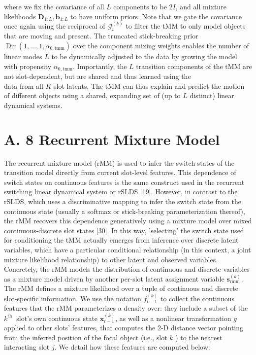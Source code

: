 \documentclass[10pt]{article}
\begin{document}
where we fix the covariance of all $L$ components to be $2 I$, and all mixture likelihoods $\boldsymbol{D}_{1: L}, \boldsymbol{b}_{1: L}$ to have uniform priors. Note that we gate the covariance once again using the reciprocal of $\mathcal{G}_{t}^{(k)}$ to filter the tMM to only model objects that are moving and present. The truncated stick-breaking prior $\operatorname{Dir}\left(1, \ldots, 1, \alpha_{0, \mathrm{tmm}}\right)$ over the component mixing weights enables the number of linear modes $L$ to be dynamically adjusted to the data by growing the model with propensity $\alpha_{0, \mathrm{tmm}}$. Importantly, the $L$ transition components of the tMM are not slot-dependent, but are shared and thus learned using the\\
data from all $K$ slot latents. The tMM can thus explain and predict the motion of different objects using a shared, expanding set of (up to $L$ distinct) linear dynamical systems.

\section*{A. 8 Recurrent Mixture Model}
The recurrent mixture model (rMM) is used to infer the switch states of the transition model directly from current slot-level features. This dependence of switch states on continuous features is the same construct used in the recurrent switching linear dynamical system or rSLDS [19]. However, in contrast to the rSLDS, which uses a discriminative mapping to infer the switch state from the continuous state (usually a softmax or stick-breaking parameterization thereof), the rMM recovers this dependence generatively using a mixture model over mixed continuous-discrete slot states [30]. In this way, 'selecting' the switch state used for conditioning the tMM actually emerges from inference over discrete latent variables, which have a particular conditional relationship (in this context, a joint mixture likelihood relationship) to other latent and observed variables. Concretely, the rMM models the distribution of continuous and discrete variables as a mixture model driven by another per-slot latent assignment variable $\mathbf{s}_{\mathrm{rmm}}^{(k)}$. The rMM defines a mixture likelihood over a tuple of continuous and discrete slot-specific information. We use the notation $f_{t-1}^{(k)}$ to collect the continuous features that the rMM parameterizes a density over: they include a subset of the $k^{\text {th }}$ slot's own continuous state $\mathbf{x}_{t-1}^{(k)}$, as well as a nonlinear transformation $g$ applied to other slots' features, that computes the 2-D distance vector pointing from the inferred position of the focal object (i.e., slot $k$ ) to the nearest interacting slot $j$. We detail how these features are computed below:
\end{document}

